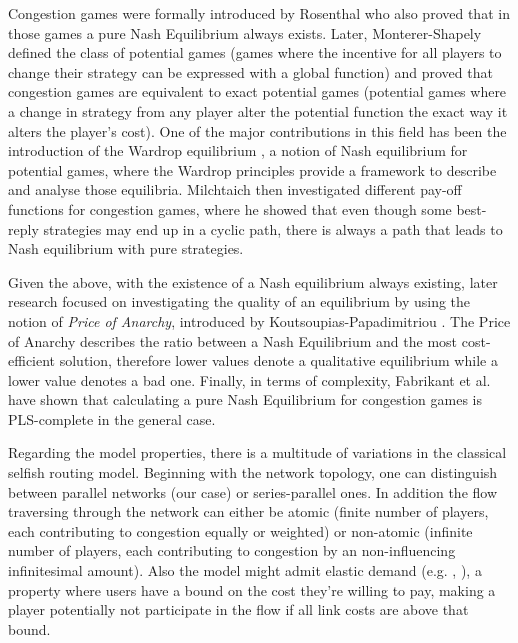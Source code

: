 \documentclass[10pt,a4paper]{book}
\theoremstyle{definition}
\theoremstyle{comment}
\begin{document}
Congestion games were formally introduced by Rosenthal \cite{Rosenthal1973ACO} who also proved that in those games a pure Nash Equilibrium always exists.
Later, Monterer-Shapely \cite{MONDERER1996124} defined the class of potential games (games where the incentive for all players to change their strategy can be expressed with a global function) and proved that congestion games are equivalent to exact potential games (potential games where a change in strategy from any player alter the potential function the exact way it alters the player's cost).
One of the major contributions in this field has been the introduction of the Wardrop equilibrium \cite{wardrop_theoretical_1952}, a notion of Nash equilibrium for potential games, where the Wardrop principles provide a framework to describe and analyse those equilibria.
Milchtaich \cite{MILCHTAICH1996111} then investigated different pay-off functions for congestion games, where he showed that even though some best-reply strategies may end up in a cyclic path, there is always a path that leads to Nash equilibrium with pure strategies.

Given the above, with the existence of a Nash equilibrium always existing, later research focused on investigating the quality of an equilibrium by using the notion of \textit{Price of Anarchy}, introduced by Koutsoupias-Papadimitriou \cite{KOUTSOUPIAS200965}.
The Price of Anarchy describes the ratio between a Nash Equilibrium and the most cost-efficient solution, therefore lower values denote a qualitative equilibrium while a lower value denotes a bad one.
Finally, in terms of complexity, Fabrikant et al. \cite{10.1145/1007352.1007445} have shown that calculating a pure Nash Equilibrium for congestion games is PLS-complete in the general case.

Regarding the model properties, there is a multitude of variations in the classical selfish routing model.
Beginning with the network topology, one can distinguish between parallel networks (our case) or series-parallel ones.
In addition the flow traversing through the network can either be atomic (finite number of players, each contributing to congestion equally or weighted) or non-atomic (infinite number of players, each contributing to congestion by an non-influencing infinitesimal amount).
Also the model might admit elastic demand (e.g. \cite{10.1287/moor.1060.0231}, \cite{Hearn1998}), a property where users have a bound on the cost they're willing to pay, making a player potentially not participate in the flow if all link costs are above that bound.
\end{document}
